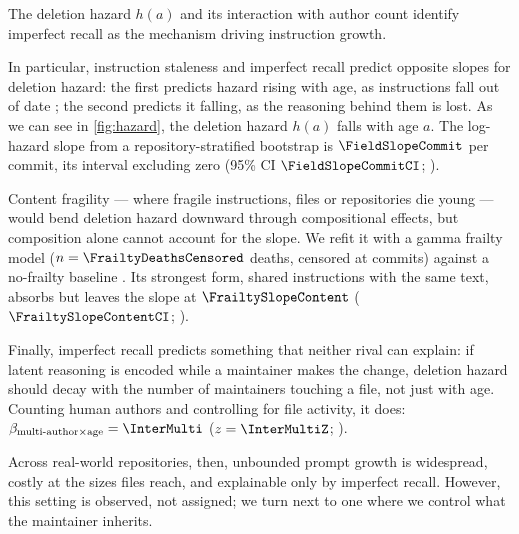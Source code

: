 The deletion hazard $h(a)$ and its interaction with author count identify imperfect recall as the
mechanism driving instruction growth.

In particular, instruction staleness and imperfect recall predict opposite slopes for deletion
hazard: the first predicts hazard rising with age, as instructions fall out of date
\citep{lehman1980laws, panthaplackel2021jit}; the second predicts it falling, as the reasoning behind
them is lost. As we can see in \autoref{fig:hazard}, the deletion hazard $h(a)$ falls with age $a$. The
log-hazard slope from a repository-stratified bootstrap is $\FieldSlopeCommit$ per commit, its interval
excluding zero (95\% CI $\FieldSlopeCommitCI$; ).

Content fragility --- where fragile instructions, files or repositories die young --- would bend deletion hazard
downward through compositional effects, but composition alone cannot account for the slope. We refit it with a
gamma frailty model ($n = \FrailtyDeathsCensored$ deaths, censored at \HazardAgeMax{} commits) against a no-frailty
baseline \citep{vaupel1979frailty}. Its strongest form, shared instructions with the same text, absorbs
\FrailtyAbsorbedContent{} but leaves the slope at $\FrailtySlopeContent$ ($\FrailtySlopeContentCI$;
).

Finally, imperfect recall predicts something that neither rival can explain: if latent reasoning is encoded
while a maintainer makes the change, deletion hazard should decay with the number of maintainers touching a
file, not just with age. Counting human authors and controlling for file activity, it does:
$\beta_{\text{multi-author} \times \text{age}} = \InterMulti$ ($z = \InterMultiZ$; ).

Across real-world repositories, then, unbounded prompt growth is widespread, costly at the sizes files reach,
and explainable only by imperfect recall. However, this setting is observed, not assigned; we turn next to one where
we control what the maintainer inherits.
